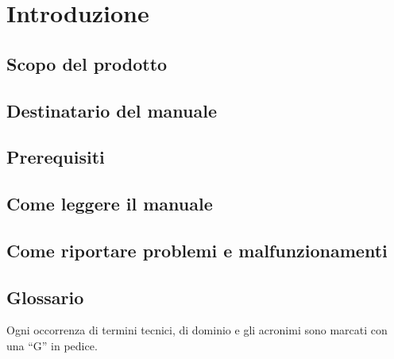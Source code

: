 \section{Introduzione}

	\subsection{Scopo del prodotto}
	\ScopoDelProdotto 

	\subsection{Destinatario del manuale}

	\subsection{Prerequisiti}

	\subsection{Come leggere il manuale}

	\subsection{Come riportare problemi e malfunzionamenti}


	\subsection{Glossario}
	Ogni occorrenza di termini tecnici, di dominio e gli acronimi sono marcati con una ``G'' in pedice.



